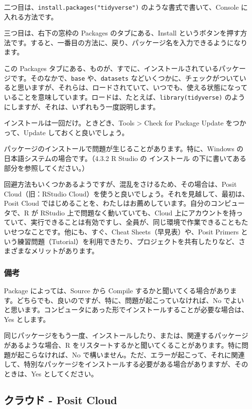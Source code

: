 \documentclass[
]{bxjsbook}
\theoremstyle{definition}
\theoremstyle{definition}
\theoremstyle{definition}
\theoremstyle{definition}
\theoremstyle{remark}
\begin{document}
二つ目は、\texttt{install.packages("tidyverse")} のような書式で書いて、Console に入れる方法です。

三つ目は、右下の窓枠の Packages のタブにある、Install というボタンを押す方法です。すると、一番目の方法に、戻り、パッケージ名を入力できるようになります。

この Packages タブにある、ものが、すでに、インストールされているパッケージです。そのなかで、\texttt{base} や、\texttt{datasets} などいくつかに、チェックがついていると思いますが、それらは、ロードされていて、いつでも、使える状態になっていることを意味しています。ロードは、たとえば、\texttt{library(tidyverse)} のようにしますが、それは、いずれもう一度説明します。

インストールは一回だけ。ときどき、Tools \textgreater{} Check for Package Update をつかって、Update しておくと良いでしょう。

パッケージのインストールで問題が生じることがあります。特に、Windows の日本語システムの場合です。（4.3.2 R Studio の インストール の下に書いてある部分を参照してください。）

回避方法もいくつかあるようですが、混乱をさけるため、その場合は、Posit Cloud（旧：RStudio Cloud）を使うと良いでしょう。それを見越して、最初は、Posit Cloud ではじめることを、わたしはお薦めしています。自分のコンピュータで、R が RStudio 上で問題なく動いていても、Cloud 上にアカウントを持っていて、実行できることは有効ですし、全員が、同じ環境で作業できることもたいせつなことです。他にも、すぐ、Cheat Sheets（早見表）や、Posit Primers という練習問題（Tutorial）を利用できたり、プロジェクトを共有したりなど、さまざまなメリットがあります。

\hypertarget{ux5099ux8003}{%
\subsubsection{備考}\label{ux5099ux8003}}

Package によっては、Source から Compile するかと聞いてくる場合があります。どちらでも、良いのですが、特に、問題が起こっていなければ、No でよいと思います。コンピュータにあった形でインストールすることが必要な場合は、Yes とします。

同じパッケージをもう一度、インストールしたり、または、関連するパッケージがあるような場合、R をリスタートするかと聞いてくることがあります。特に問題が起こらなければ、No で構いません。ただ、エラーが起こって、それに関連して、特別なパッケージをインストールする必要がある場合がありますが、そのときは、Yes としてください。

\hypertarget{ux30afux30e9ux30a6ux30c9---posit-cloud}{%
\subsection{クラウド - Posit Cloud}\label{ux30afux30e9ux30a6ux30c9---posit-cloud}}
\end{document}
